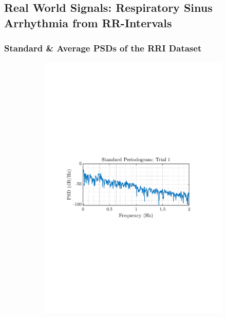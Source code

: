 \documentclass[12pt]{article}
\begin{document}
	\pagebreak
	
	\subsection{Real World Signals: Respiratory Sinus Arrhythmia from RR-Intervals} \label{sec: 1-5-real-world-signals}
	
	\subsubsection{Standard \& Average PSDs of the RRI Dataset}
	\begin{figure}[H]
		\centering
		\begin{subfigure}{0.49\textwidth}
			\centering
			\includegraphics[trim={2.2cm 11cm 3.15cm  11.2cm}, clip, width=\textwidth]{../MATLAB/figures/q1_5a_fig01.pdf} 
		\end{subfigure}

\end{figure}
\end{document}
